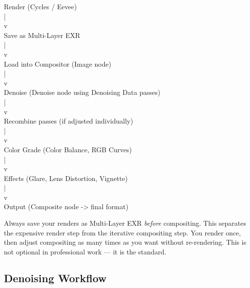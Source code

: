 \begin{codebox}
Render (Cycles / Eevee)\\
\hspace*{1em}|\\
\hspace*{1em}v\\
Save as Multi-Layer EXR\\
\hspace*{1em}|\\
\hspace*{1em}v\\
Load into Compositor (Image node)\\
\hspace*{1em}|\\
\hspace*{1em}v\\
Denoise (Denoise node using Denoising Data passes)\\
\hspace*{1em}|\\
\hspace*{1em}v\\
Recombine passes (if adjusted individually)\\
\hspace*{1em}|\\
\hspace*{1em}v\\
Color Grade (Color Balance, RGB Curves)\\
\hspace*{1em}|\\
\hspace*{1em}v\\
Effects (Glare, Lens Distortion, Vignette)\\
\hspace*{1em}|\\
\hspace*{1em}v\\
Output (Composite node -> final format)
\end{codebox}

\begin{tipbox}
Always save your renders as Multi-Layer EXR \textit{before} compositing. This separates the expensive render step from the iterative compositing step. You render once, then adjust compositing as many times as you want without re-rendering. This is not optional in professional work --- it is the standard.
\end{tipbox}

\subsection{Denoising Workflow}

